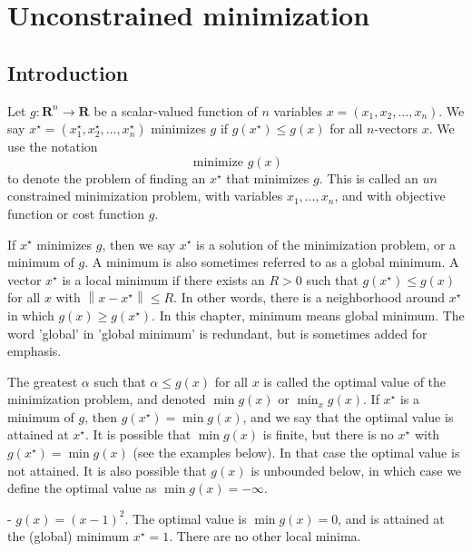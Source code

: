 \chapter{Unconstrained minimization}

\section{Introduction}

Let $ g: \mathbf{R}^{n} \rightarrow \mathbf{R} $ be a scalar-valued function of $ n $ variables $ x=\left(x_{1}, x_{2}, \ldots, x_{n}\right) . $ We say $ x^{\star}=\left(x_{1}^{\star}, x_{2}^{\star}, \ldots, x_{n}^{\star}\right) $ minimizes $ g $ if $ g\left(x^{\star}\right) \leq g(x) $ for all $ n $-vectors $ x $. We use the notation
\begin{equation}
\text { minimize } g(x)
\end{equation}
to denote the problem of finding an $ x^{\star} $ that minimizes $ g $. This is called an $ u n $ constrained minimization problem, with variables $ x_{1}, \ldots, x_{n} $, and with objective function or cost function $ g $.

If $ x^{\star} $ minimizes $ g $, then we say $ x^{\star} $ is a solution of the minimization problem, or a minimum of $ g . $ A minimum is also sometimes referred to as a global minimum. A vector $ x^{\star} $ is a local minimum if there exists an $ R>0 $ such that $ g\left(x^{\star}\right) \leq g(x) $ for all $ x $ with $ \left\|x-x^{\star}\right\| \leq R $. In other words, there is a neighborhood around $ x^{\star} $ in which $ g(x) \geq g\left(x^{\star}\right) $. In this chapter, minimum means global minimum. The word 'global' in 'global minimum' is redundant, but is sometimes added for emphasis.

The greatest $ \alpha $ such that $ \alpha \leq g(x) $ for all $ x $ is called the optimal value of the minimization problem, and denoted
$ \min g(x) $
or $ \min _{x} g(x) $. If $ x^{\star} $ is a minimum of $ g $, then $ g\left(x^{\star}\right)=\min g(x) $, and we say that the optimal value is attained at $ x^{\star} $. It is possible that $ \min g(x) $ is finite, but there is no $ x^{\star} $ with $ g\left(x^{\star}\right)=\min g(x) $ (see the examples below). In that case the optimal value is not attained. It is also possible that $ g(x) $ is unbounded below, in which case we define the optimal value as $ \min g(x)=-\infty $.

\begin{example}
    - $ g(x)=(x-1)^{2} $. The optimal value is $ \min g(x)=0 $, and is attained at the (global) minimum $ x^{\star}=1 $. There are no other local minima.
\end{example}

